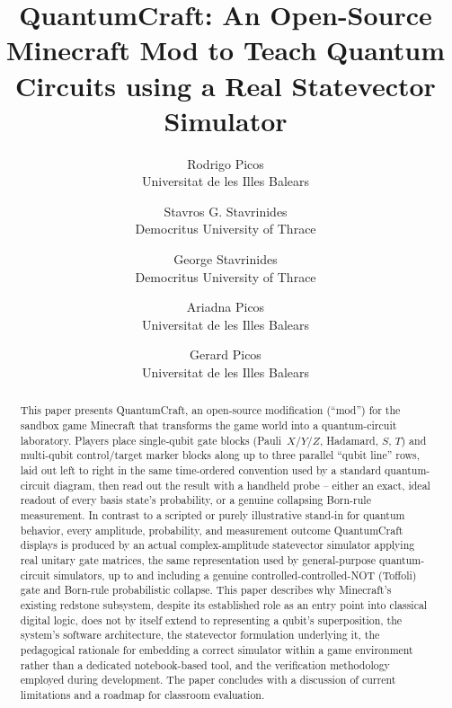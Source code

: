 \documentclass[11pt]{article}
\title{QuantumCraft: An Open-Source Minecraft Mod to Teach Quantum Circuits using a Real Statevector Simulator}
\author{
Rodrigo Picos\\
\small Universitat de les Illes Balears
\and
Stavros G. Stavrinides\\
\small Democritus University of Thrace
\and
George Stavrinides\\
\small Democritus University of Thrace
\and
Ariadna Picos\\
\small Universitat de les Illes Balears
\and
Gerard Picos\\
\small Universitat de les Illes Balears
}
\date{}
\begin{document}
\maketitle

\begin{abstract}
This paper presents QuantumCraft, an open-source modification (``mod'') for the sandbox
game Minecraft that transforms the game world into a quantum-circuit laboratory. Players
place single-qubit gate blocks (Pauli~$X$/$Y$/$Z$, Hadamard, $S$, $T$) and multi-qubit
control/target marker blocks along up to three parallel ``qubit line'' rows, laid out
left to right in the same time-ordered convention used by a standard quantum-circuit
diagram, then read out the result with a handheld probe -- either an exact, ideal
readout of every basis state's probability, or a genuine collapsing Born-rule
measurement. In contrast to a scripted or purely illustrative stand-in for quantum
behavior, every amplitude, probability, and measurement outcome QuantumCraft displays is
produced by an actual complex-amplitude statevector simulator applying real unitary gate
matrices, the same representation used by general-purpose quantum-circuit simulators, up
to and including a genuine controlled-controlled-NOT (Toffoli) gate and Born-rule
probabilistic collapse. This paper describes why Minecraft's existing redstone subsystem,
despite its established role as an entry point into classical digital logic, does not by
itself extend to representing a qubit's superposition, the system's software
architecture, the statevector formulation underlying it, the pedagogical rationale for
embedding a correct simulator within a game environment rather than a dedicated
notebook-based tool, and the verification methodology employed during development. The
paper concludes with a discussion of current limitations and a roadmap for classroom
evaluation.
\end{abstract}
















\clearpage

\end{document}
